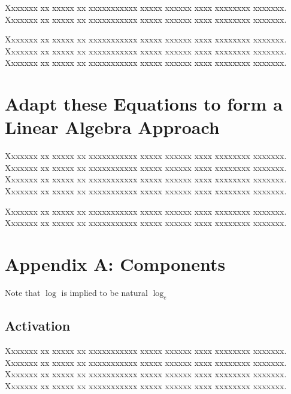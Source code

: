\documentclass{article}
\begin{document}
Xxxxxxx xx xxxxx xx xxxxxxxxxxx xxxxx xxxxxx xxxx xxxxxxxx xxxxxxx.
Xxxxxxx xx xxxxx xx xxxxxxxxxxx xxxxx xxxxxx xxxx xxxxxxxx xxxxxxx.

Xxxxxxx xx xxxxx xx xxxxxxxxxxx xxxxx xxxxxx xxxx xxxxxxxx xxxxxxx.
Xxxxxxx xx xxxxx xx xxxxxxxxxxx xxxxx xxxxxx xxxx xxxxxxxx xxxxxxx.
Xxxxxxx xx xxxxx xx xxxxxxxxxxx xxxxx xxxxxx xxxx xxxxxxxx xxxxxxx.



\section{Adapt these Equations to form a Linear Algebra Approach}

Xxxxxxx xx xxxxx xx xxxxxxxxxxx xxxxx xxxxxx xxxx xxxxxxxx xxxxxxx.
Xxxxxxx xx xxxxx xx xxxxxxxxxxx xxxxx xxxxxx xxxx xxxxxxxx xxxxxxx.
Xxxxxxx xx xxxxx xx xxxxxxxxxxx xxxxx xxxxxx xxxx xxxxxxxx xxxxxxx.
Xxxxxxx xx xxxxx xx xxxxxxxxxxx xxxxx xxxxxx xxxx xxxxxxxx xxxxxxx.

Xxxxxxx xx xxxxx xx xxxxxxxxxxx xxxxx xxxxxx xxxx xxxxxxxx xxxxxxx.
Xxxxxxx xx xxxxx xx xxxxxxxxxxx xxxxx xxxxxx xxxx xxxxxxxx xxxxxxx.




\nocite{berns:91}
\nocite{hecht:90}
\nocite{kosko:92}

\clearpage


\section*{Appendix A: Components}

Note that $\log$ is implied to be natural $\log_e$

\subsection{Activation}

Xxxxxxx xx xxxxx xx xxxxxxxxxxx xxxxx xxxxxx xxxx xxxxxxxx xxxxxxx.
Xxxxxxx xx xxxxx xx xxxxxxxxxxx xxxxx xxxxxx xxxx xxxxxxxx xxxxxxx.
Xxxxxxx xx xxxxx xx xxxxxxxxxxx xxxxx xxxxxx xxxx xxxxxxxx xxxxxxx.
Xxxxxxx xx xxxxx xx xxxxxxxxxxx xxxxx xxxxxx xxxx xxxxxxxx xxxxxxx.
\end{document}
